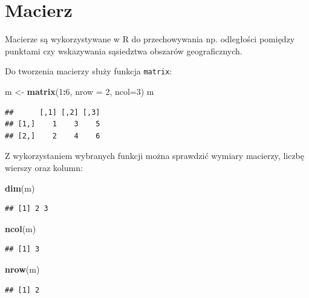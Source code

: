 \documentclass[]{book}
\newenvironment{Shaded}{\begin{snugshade}}{\end{snugshade}}
\newcommand{\KeywordTok}[1]{\textcolor[rgb]{0.13,0.29,0.53}{\textbf{#1}}}
\newcommand{\DataTypeTok}[1]{\textcolor[rgb]{0.13,0.29,0.53}{#1}}
\newcommand{\DecValTok}[1]{\textcolor[rgb]{0.00,0.00,0.81}{#1}}
\newcommand{\StringTok}[1]{\textcolor[rgb]{0.31,0.60,0.02}{#1}}
\newcommand{\OperatorTok}[1]{\textcolor[rgb]{0.81,0.36,0.00}{\textbf{#1}}}
\newcommand{\NormalTok}[1]{#1}
\begin{document}
\section{Macierz}\label{macierz}

Macierze są wykorzystywane w R do przechowywania np. odległości pomiędzy
punktami czy wskazywania sąsiedztwa obszarów geograficznych.

Do tworzenia macierzy służy funkcja \texttt{matrix}:

\begin{Shaded}
\begin{Highlighting}[]
\NormalTok{m <-}\StringTok{ }\KeywordTok{matrix}\NormalTok{(}\DecValTok{1}\OperatorTok{:}\DecValTok{6}\NormalTok{, }\DataTypeTok{nrow =} \DecValTok{2}\NormalTok{, }\DataTypeTok{ncol=}\DecValTok{3}\NormalTok{)}
\NormalTok{m}
\end{Highlighting}
\end{Shaded}

\begin{verbatim}
##      [,1] [,2] [,3]
## [1,]    1    3    5
## [2,]    2    4    6
\end{verbatim}

Z wykorzystaniem wybranych funkcji można sprawdzić wymiary macierzy,
liczbę wierszy oraz kolumn:

\begin{Shaded}
\begin{Highlighting}[]
\KeywordTok{dim}\NormalTok{(m)}
\end{Highlighting}
\end{Shaded}

\begin{verbatim}
## [1] 2 3
\end{verbatim}

\begin{Shaded}
\begin{Highlighting}[]
\KeywordTok{ncol}\NormalTok{(m)}
\end{Highlighting}
\end{Shaded}

\begin{verbatim}
## [1] 3
\end{verbatim}

\begin{Shaded}
\begin{Highlighting}[]
\KeywordTok{nrow}\NormalTok{(m)}
\end{Highlighting}
\end{Shaded}

\begin{verbatim}
## [1] 2
\end{verbatim}
\end{document}
